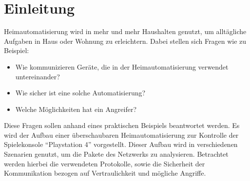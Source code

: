 \newpage
\section{Einleitung}\label{sec:einleitung}
Heimautomatisierung wird in mehr und mehr Haushalten genutzt,
um alltägliche Aufgaben in Haus oder Wohnung zu erleichtern.
Dabei stellen sich Fragen wie zu Beispiel:

\begin{itemize}
    \item Wie kommunizieren Geräte,
    die in der Heimautomatisierung verwendet untereinander?
    \item Wie sicher ist eine solche Automatisierung?
    \item Welche Möglichkeiten hat ein Angreifer?
\end{itemize}

Diese Fragen sollen anhand eines praktischen Beispiels beantwortet werden.
Es wird der Aufbau einer überschaubaren Heimautomatisierung zur Kontrolle der Spielekonsole \enquote{Playstation 4} vorgestellt.
Dieser Aufbau wird in verschiedenen Szenarien genutzt,
 um die Pakete des Netzwerks zu analysieren.
Betrachtet werden hierbei die verwendeten Protokolle,
 sowie die Sicherheit der Kommunikation bezogen auf Vertraulichkeit und mögliche Angriffe.
